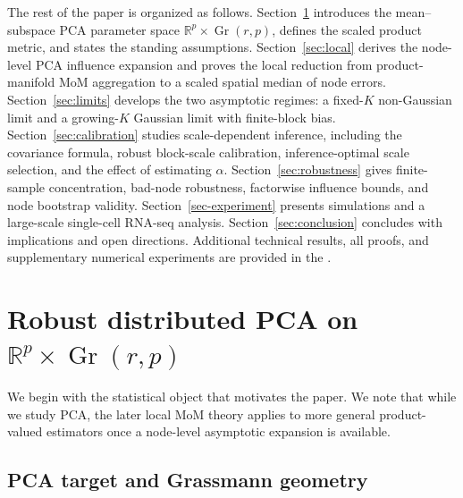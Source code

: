 \documentclass[11pt]{article}
\newcommand{\R}{\mathbb R}
\newcommand{\Gr}{\operatorname{Gr}}
\begin{document}
The rest of the paper is organized as follows.  Section~\ref{sec:framework}
introduces the mean--subspace PCA parameter space
\(\R^p\times\Gr(r,p)\), defines the scaled product metric, and states the
standing assumptions.  Section~\ref{sec:local} derives the node-level PCA
influence expansion and proves the local reduction from product-manifold MoM
aggregation to a scaled spatial median of node errors.  Section~\ref{sec:limits}
develops the two asymptotic regimes: a fixed-\(K\) non-Gaussian limit and a
growing-\(K\) Gaussian limit with finite-block bias.  Section~\ref{sec:calibration}
studies scale-dependent inference, including the covariance formula, robust
block-scale calibration, inference-optimal scale selection, and the effect of
estimating \(\alpha\).  Section~\ref{sec:robustness} gives finite-sample
concentration, bad-node robustness, factorwise influence bounds, and node
bootstrap validity.  Section~\ref{sec-experiment} presents simulations and a
large-scale single-cell RNA-seq analysis.  Section~\ref{sec:conclusion}
concludes with implications and open directions.  Additional technical results,
all proofs, and supplementary numerical experiments are provided in the
.





\section{Robust distributed PCA on \texorpdfstring{$\R^p\times\Gr(r,p)$}{R^p x Gr(r,p)}}\label{sec:framework}

We begin with the statistical object that motivates the paper. We note that while we study PCA, the later local MoM theory applies to more general product-valued estimators once a node-level asymptotic expansion is available.

\subsection{PCA target and Grassmann geometry}
\end{document}
